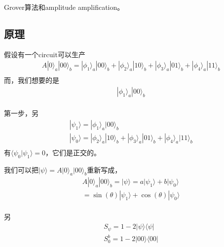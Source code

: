 Grover算法和amplitude amplification。


\subsection{原理}

假设有一个circuit可以生产
\begin{equation}
\begin{split}
&A|0\rangle _a|00\rangle _b = |\phi _1\rangle _a |00\rangle _b+|\phi _2\rangle _a |10\rangle _b+|\phi _3\rangle _a |01\rangle _b+|\phi _4\rangle _a |11\rangle _b\\
\end{split}
\end{equation}
而，我们想要的是
\begin{equation}
\begin{split}
&|\phi _1\rangle _a |00\rangle _b\\
\end{split}
\end{equation}

第一步，另
\begin{equation}
\begin{split}
&|\psi _ 1\rangle  = |\phi _1\rangle _a |00\rangle _b\\
&|\psi _ 0\rangle  = |\phi _2\rangle _a |10\rangle _b+|\phi _3\rangle _a |01\rangle _b+|\phi _4\rangle _a |11\rangle _b\\
\end{split}
\end{equation}
有$\langle \psi _0 | \psi _1 \rangle = 0$，它们是正交的。


我们可以把$|\psi\rangle = A|0\rangle _a|00\rangle _b$重新写成，
\begin{equation}
\begin{split}
&A|0\rangle _a|00\rangle _b =|\psi\rangle= a|\psi _ 1\rangle+b |\psi _ 0\rangle\\
&=\sin(\theta)|\psi _ 1\rangle + \cos (\theta)|\psi _ 0\rangle\\
\end{split}
\end{equation}

另
\begin{equation}
\begin{split}
&S_{\psi}=1-2|\psi\rangle \langle \psi|\\
&S_0^b=1-2|00\rangle \langle 00|\\
\end{split}
\end{equation}


